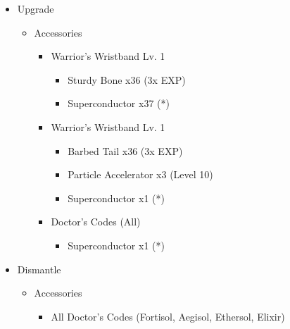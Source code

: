 \begin{multicols}{2}
\begin{upgrade}
\begin{itemize}
    \item Upgrade
    \begin{itemize}
        \item Accessories
        \begin{itemize}
            \item Warrior's Wristband Lv. 1
            \begin{itemize}
                \item Sturdy Bone x36 (3x EXP)
                \item Superconductor x37 (*)
            \end{itemize}
            \item Warrior's Wristband Lv. 1
            \begin{itemize}
                \item Barbed Tail x36 (3x EXP)
                \item Particle Accelerator x3 (Level 10)
                \item Superconductor x1 (*)
            \end{itemize}
            \item Doctor's Codes (All)
            \begin{itemize}
                \item Superconductor x1 (*)
            \end{itemize}
        \end{itemize}
    \end{itemize}
    \item Dismantle
    \begin{itemize}
        \item Accessories
        \begin{itemize}
            \item All Doctor's Codes (Fortisol, Aegisol, Ethersol, Elixir)
        \end{itemize}
    \end{itemize}
\end{itemize}
\end{upgrade}
\renewcommand{\first}{[1] Riot Shield (\syn/\sen/\rav)}
\renewcommand{\second}{[2] Relentless Assault (\com/\rav/\rav)}
\renewcommand{\third}{[3] Mystic Tower (\rav/\sen/\rav)}
\renewcommand{\fourth}{[4] Aggression (\com/\com/\rav)}
\renewcommand{\fifth}{[5] Matador (\rav/\sen/\sab)}
\renewcommand{\sixth}{[6] Aggression (\com/\com/\rav)}


\end{multicols}
